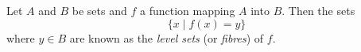 \documentclass[12pt]{article}
\begin{document}

Let $A$ and $B$ be sets and $f$ a function mapping $A$ into $B$.  Then the sets
 $$\{ x \mid f(x) = y \}$$
where $y \in B$ are known as the \emph{level sets} (or \emph{fibres}) of $f$.
\end{document}
